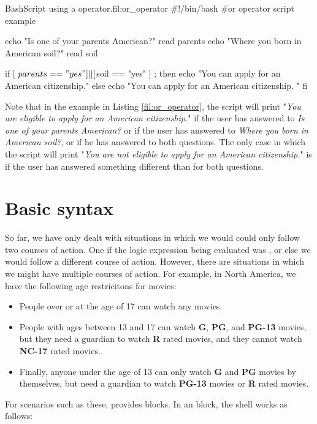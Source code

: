 \begin{source_code_float}{Bash}{Script using a \mycommand{||} operator.}{fil:or_operator}
#!/bin/bash
#or operator script example

echo "Is one of your parents American?"
read parents
echo "Where you born in American soil?"
read soil

if [ $parents == "yes" ] || [ $soil == "yes" ] ; then
    echo "You can apply for an American citizenship."   
else
    echo "You can apply for an American citizenship. "   
fi
\end{source_code_float}
Note that in the example in Listing \ref{fil:or_operator}, the script will print "\textit{You are eligible to apply for an American citizenship.}" if the user has answered  to \textit{ Is one of your parents American?} or if the user has answered  to \textit{ Where you born in American soil?}, or if he has answered  to both questions. The only case in which the script will print "\textit{You are not eligible to apply for an American citizenship.}" is if the user has answered something different than  for both questions.


\section{Basic  syntax}

So far, we have only dealt with situations in which we would could only follow two courses of action. One if the logic expression being evaluated was , or else we would follow a different course of action. However, there are situations in which we might have multiple courses of action. For example, in North America, we have the following age restricitons for movies:
\begin{itemize}
\item People over or at the age of 17 can watch any movies. 
\item People with ages between 13 and 17 can watch \textbf{G}, \textbf{PG}, and \textbf{PG-13} movies, but they need a guardian to watch \textbf{R} rated movies, and they cannot watch \textbf{NC-17} rated movies. 
\item Finally, anyone under the age of 13 can only watch \textbf{G} and \textbf{PG} movies by themselves, but need a guardian to watch \textbf{PG-13} movies or \textbf{R} rated movies. 
\end{itemize}
For scenarios such as these,  provides  blocks. In an  block, the shell works as follows:

